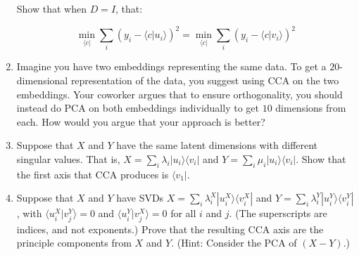 \documentclass{amsbook}
\begin{document}
\begin{enumerate}
\noindent Show that when $D=I$, that:

$$
\min_{\langle c|}\sum_i \left(y_i-\langle c|u_{i}\rangle\right)^2 = \min_{\langle c|}\sum_i \left(y_i-\langle c|v_{i}\rangle\right)^2
$$
\item Imagine you have two embeddings representing the same data.  To get a $20$-dimensional representation of the data, you suggest using CCA on the two embeddings.  Your coworker argues that to ensure orthogonality, you should instead do PCA on both embeddings individually to get $10$ dimensions from each.  How would you argue that your approach is better?
\item Suppose that $X$ and $Y$ have the same latent dimensions with different singular values.  That is, $X=\sum_i\lambda_i|u_i\rangle\langle v_i|$ and $Y=\sum_i\mu_i|u_i\rangle\langle v_i|$.  Show that the first axis that CCA produces is $\langle v_1|$.
\item Suppose that $X$ and $Y$ have SVDs $X=\sum_i\lambda_i^X|u_i^X\rangle\langle v_i^X|$ and $Y=\sum_i\lambda_i^Y|u_i^Y\rangle\langle v_i^Y|$, with $\langle u_i^X|v_j^Y\rangle=0$ and $\langle u_i^Y|v_j^X\rangle=0$ for all $i$ and $j$.  (The superscripts are indices, and not exponents.)  Prove that the resulting CCA axis are the principle components from $X$ and $Y$.  (Hint: Consider the PCA of $(X-Y)$.)
\end{enumerate}
\end{document}
